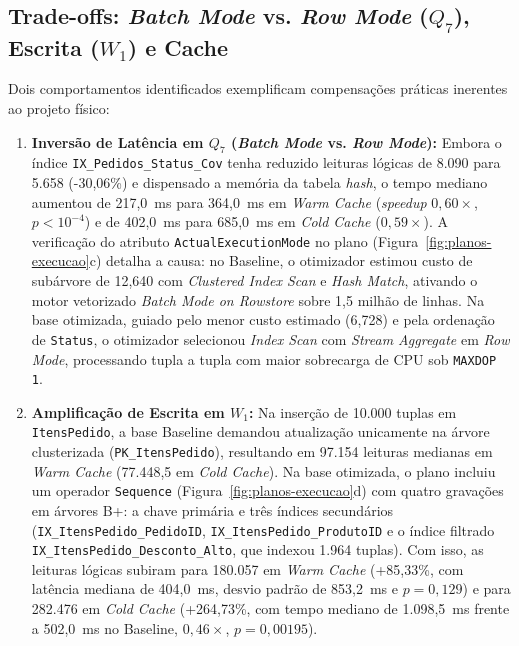 \documentclass[12pt]{article}
\begin{document}
\FloatBarrier

\subsection{Trade-offs: \textit{Batch Mode} vs. \textit{Row Mode} ($Q_7$), Escrita ($W_1$) e Cache}

Dois comportamentos identificados exemplificam compensações práticas inerentes ao projeto físico:

\begin{enumerate}
\item \textbf{Inversão de Latência em $Q_7$ (\textit{Batch Mode} vs. \textit{Row Mode}):} Embora o índice \texttt{IX\_Pedidos\_Status\_Cov} tenha reduzido leituras lógicas de 8.090 para 5.658 (-30,06\%) e dispensado a memória da tabela \textit{hash}, o tempo mediano aumentou de 217,0~ms para 364,0~ms em \textit{Warm Cache} (\textit{speedup} $0{,}60\times$, $p < 10^{-4}$) e de 402,0~ms para 685,0~ms em \textit{Cold Cache} ($0{,}59\times$). A verificação do atributo \texttt{ActualExecutionMode} no plano (Figura~\ref{fig:planos-execucao}c) detalha a causa: no Baseline, o otimizador estimou custo de subárvore de 12,640 com \textit{Clustered Index Scan} e \textit{Hash Match}, ativando o motor vetorizado \textit{Batch Mode on Rowstore} sobre 1,5 milhão de linhas. Na base otimizada, guiado pelo menor custo estimado (6,728) e pela ordenação de \texttt{Status}, o otimizador selecionou \textit{Index Scan} com \textit{Stream Aggregate} em \textit{Row Mode}, processando tupla a tupla com maior sobrecarga de CPU sob \texttt{MAXDOP 1}.

\item \textbf{Amplificação de Escrita em $W_1$:} Na inserção de 10.000 tuplas em \texttt{ItensPedido}, a base Baseline demandou atualização unicamente na árvore clusterizada (\texttt{PK\_ItensPedido}), resultando em 97.154 leituras medianas em \textit{Warm Cache} (77.448,5 em \textit{Cold Cache}). Na base otimizada, o plano incluiu um operador \texttt{Sequence} (Figura~\ref{fig:planos-execucao}d) com quatro gravações em árvores B+: a chave primária e três índices secundários (\texttt{IX\_ItensPedido\_PedidoID}, \texttt{IX\_ItensPedido\_ProdutoID} e o índice filtrado \texttt{IX\_ItensPedido\_Desconto\_Alto}, que indexou 1.964 tuplas). Com isso, as leituras lógicas subiram para 180.057 em \textit{Warm Cache} (+85,33\%, com latência mediana de 404,0~ms, desvio padrão de 853,2~ms e $p = 0{,}129$) e para 282.476 em \textit{Cold Cache} (+264,73\%, com tempo mediano de 1.098,5~ms frente a 502,0~ms no Baseline, $0{,}46\times$, $p = 0{,}00195$).
\end{enumerate}
\end{document}
